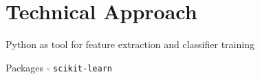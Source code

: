 \documentclass[dissertation.tex]{subfiles}
\begin{document}
\chapter{Technical Approach}
Python as tool for feature extraction and classifier training

Packages - \texttt{scikit-learn}
\end{document}
